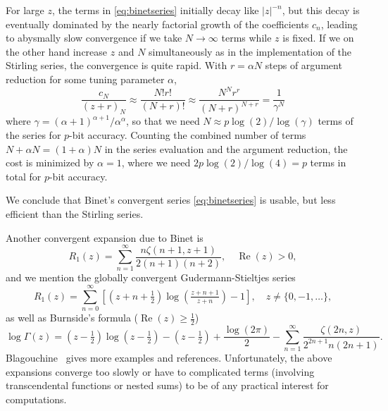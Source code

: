 \documentclass[reqno]{amsart}
\newcommand{\Real}{\operatorname{Re}}
\theoremstyle{definition}
\begin{document}
For large $z$, the terms in \eqref{eq:binetseries}
initially decay like $|z|^{-n}$, but this decay is eventually dominated
by the nearly factorial growth of the coefficients $c_n$, leading to
abysmally slow convergence if we take $N \to \infty$ terms while $z$ is fixed.
If we on the other hand increase $z$ and $N$ simultaneously as in the
implementation of the Stirling series, the convergence is quite rapid.
With $r = \alpha N$ steps of argument reduction
for some tuning parameter $\alpha$,
\begin{equation}
\frac{c_N}{(z+r)_{N}} \approx \frac{N! r!}{(N+r)!} \approx \frac{N^N r^r}{(N+r)^{N+r}} = \frac{1}{\gamma^N}
\end{equation}
where $\gamma = (\alpha+1)^{\alpha+1} / \alpha^\alpha$,
so that we need $N \approx p \log(2) / \log(\gamma)$ terms of the series
for $p$-bit accuracy.
Counting the combined number of terms $N + \alpha N = (1+\alpha) N$ in the series evaluation and the argument reduction,
the cost is minimized by $\alpha = 1$,
where we need $2 p \log(2)/\log(4) = p$ terms in total for $p$-bit accuracy.

We conclude that Binet's convergent series \eqref{eq:binetseries} is usable,
but less efficient than the Stirling series.

Another convergent expansion due to Binet is
\begin{equation}
R_1(z) = \sum_{n=1}^{\infty} \frac{n \zeta(n+1, z+1)}{2(n+1)(n+2)}, \quad \Real(z) > 0,
\end{equation}
and we mention the globally convergent Gudermann-Stieltjes series~\cite{stieltjes1889developpement,Barata2011}
\begin{equation}
R_1(z) = \sum_{n=0}^{\infty} \left[ (z+n+\tfrac{1}{2}) \log\!\left(\tfrac{z+n+1}{z+n}\right) - 1 \right], \quad z \ne \{0, -1, \ldots \},
\end{equation}
as well as Burnside's formula ($\Real(z) \ge \tfrac{1}{2}$)
\begin{equation}
\log \Gamma(z) = (z-\tfrac{1}{2}) \log(z-\tfrac{1}{2}) - (z-\tfrac{1}{2}) + \frac{\log(2\pi)}{2} -
\sum_{n=1}^{\infty} \frac{\zeta(2n, z)}{2^{2n+1} n (2n+1)}.
\end{equation}
Blagouchine~\cite{Blagouchine2016} gives more examples and references.
Unfortunately, the above expansions converge too slowly or have to complicated
terms (involving transcendental functions or nested sums) to
be of any practical interest for computations.
\end{document}
